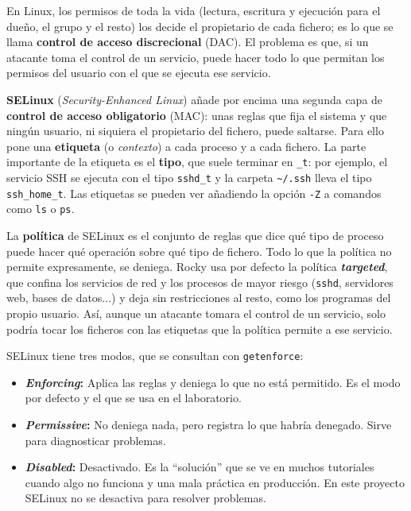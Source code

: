 \documentclass[11pt, a4paper, titlepage]{article}
\newcommand{\cod}[1]{\texttt{#1}}
\begin{document}
En Linux, los permisos de toda la vida (lectura, escritura y ejecución para el dueño, el grupo y el resto) los decide el propietario de cada fichero; es lo que se llama \textbf{control de acceso discrecional} (DAC). El problema es que, si un atacante toma el control de un servicio, puede hacer todo lo que permitan los permisos del usuario con el que se ejecuta ese servicio.

\textbf{SELinux} (\textit{Security-Enhanced Linux}) añade por encima una segunda capa de \textbf{control de acceso obligatorio} (MAC): unas reglas que fija el sistema y que ningún usuario, ni siquiera el propietario del fichero, puede saltarse. Para ello pone una \textbf{etiqueta} (o \textit{contexto}) a cada proceso y a cada fichero. La parte importante de la etiqueta es el \textbf{tipo}, que suele terminar en \cod{\_t}: por ejemplo, el servicio SSH se ejecuta con el tipo \cod{sshd\_t} y la carpeta \cod{\textasciitilde/.ssh} lleva el tipo \cod{ssh\_home\_t}. Las etiquetas se pueden ver añadiendo la opción \cod{-Z} a comandos como \cod{ls} o \cod{ps}.

La \textbf{política} de SELinux es el conjunto de reglas que dice qué tipo de proceso puede hacer qué operación sobre qué tipo de fichero. Todo lo que la política no permite expresamente, se deniega. Rocky usa por defecto la política \textbf{\textit{targeted}}, que confina los servicios de red y los procesos de mayor riesgo (\cod{sshd}, servidores web, bases de datos...) y deja sin restricciones al resto, como los programas del propio usuario. Así, aunque un atacante tomara el control de un servicio, solo podría tocar los ficheros con las etiquetas que la política permite a ese servicio.

SELinux tiene tres modos, que se consultan con \cod{getenforce}:

\begin{itemize}
    \item \textbf{\textit{Enforcing}:} Aplica las reglas y deniega lo que no está permitido. Es el modo por defecto y el que se usa en el laboratorio.
    \item \textbf{\textit{Permissive}:} No deniega nada, pero registra lo que habría denegado. Sirve para diagnosticar problemas.
    \item \textbf{\textit{Disabled}:} Desactivado. Es la ``solución'' que se ve en muchos tutoriales cuando algo no funciona y una mala práctica en producción. En este proyecto SELinux no se desactiva para resolver problemas.
\end{itemize}
\end{document}
